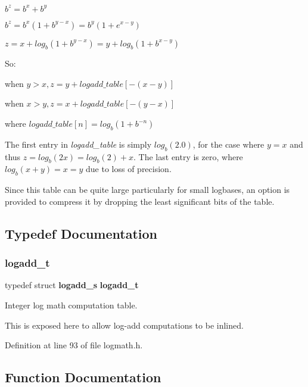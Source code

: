 \begin{DoxyItemize}
\item $ b^z = b^x + b^y $
\item $ b^z = b^x(1 + b^{y-x}) = b^y(1 + e^{x-y}) $
\item $ z = x + log_b(1 + b^{y-x}) = y + log_b(1 + b^{x-y}) $
\end{DoxyItemize}

So\+:


\begin{DoxyItemize}
\item when $ y > x, z = y + logadd\_table[-(x-y)] $
\item when $ x > y, z = x + logadd\_table[-(y-x)] $
\item where $ logadd\_table[n] = log_b(1 + b^{-n}) $
\end{DoxyItemize}

The first entry in {\itshape logadd\+\_\+table} is simply $ log_b(2.0) $, for the case where $ y = x $ and thus $ z = log_b(2x) = log_b(2) + x $. The last entry is zero, where $ log_b(x+y) = x = y $ due to loss of precision.

Since this table can be quite large particularly for small logbases, an option is provided to compress it by dropping the least significant bits of the table. 

\subsection{Typedef Documentation}
\mbox{\label{logmath_8h_a8c04c94e2c6364f6cf3b649eb4ce5bfd}} 
\subsubsection{logadd\+\_\+t}
{\footnotesize\ttfamily typedef struct \textbf{ logadd\+\_\+s} \textbf{ logadd\+\_\+t}}



Integer log math computation table. 

This is exposed here to allow log-\/add computations to be inlined. 

Definition at line 93 of file logmath.\+h.



\subsection{Function Documentation}
\mbox{\label{logmath_8h_a5eb70928578b0115c9c7ac2765396a06}} 
